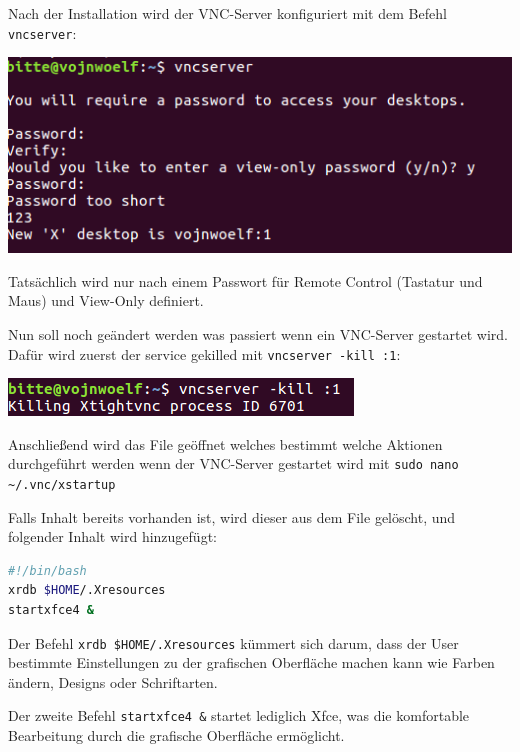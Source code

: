 Nach der Installation wird der VNC-Server konfiguriert mit dem Befehl \verb|vncserver|:

\begin{minipage}{\linewidth}
	\centering
	\includegraphics[width=0.8\linewidth]{images/vncserver}
\end{minipage}

Tatsächlich wird nur nach einem Passwort für Remote Control (Tastatur und Maus) und View-Only definiert.

Nun soll noch geändert werden was passiert wenn ein VNC-Server gestartet wird. Dafür wird zuerst der service gekilled mit \verb|vncserver -kill :1|:

\begin{minipage}{\linewidth}
	\centering
	\includegraphics[width=0.8\linewidth]{images/kill_service}
\end{minipage}

Anschließend wird das File geöffnet welches bestimmt welche Aktionen durchgeführt werden wenn der VNC-Server gestartet wird mit \verb|sudo nano ~/.vnc/xstartup|

Falls Inhalt bereits vorhanden ist, wird dieser aus dem File gelöscht, und folgender Inhalt wird hinzugefügt:

\begin{lstlisting}[language=bash]
#!/bin/bash
xrdb $HOME/.Xresources
startxfce4 &
\end{lstlisting}

Der Befehl \verb|xrdb $HOME/.Xresources| kümmert sich darum, dass der User bestimmte Einstellungen zu der grafischen Oberfläche machen kann wie Farben ändern, Designs oder Schriftarten.

Der zweite Befehl \verb|startxfce4 &| startet lediglich Xfce, was die komfortable Bearbeitung durch die grafische Oberfläche ermöglicht.


